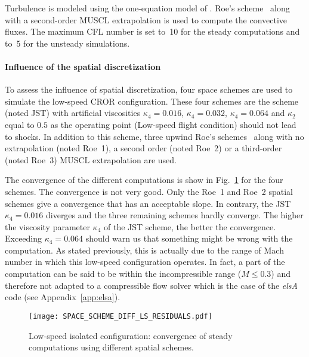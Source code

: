 Turbulence is modeled using the one-equation model of
\citet{Spalart1992}.  Roe's scheme~\cite{Roe1981} along with a 
second-order MUSCL extrapolation 
is used to compute the convective fluxes.
The maximum CFL number is set to~10 for the steady 
computations and to~5 for the unsteady simulations.

\paragraph{Influence of the spatial discretization} %
\label{sub:dream_ls_spatial_discretization}

To assess the influence of spatial discretization, four 
space schemes are used to simulate the low-speed CROR configuration.
These four schemes are the \citet{Jameson1981} scheme (noted JST) with artificial
viscosities $\kappa_4 = 0.016$, $\kappa_4 = 0.032$, $\kappa_4 = 0.064$
and $\kappa_2$ equal to $0.5$ as the operating point (Low-speed
flight condition) should not 
lead to shocks. In addition to this scheme, three upwind
Roe's schemes~\cite{Roe1981} along with no extrapolation (noted Roe~1),
a second order (noted Roe~2) or a third-order (noted Roe~3) 
MUSCL extrapolation are used.

The convergence of the different computations is show 
in Fig.~\ref{fig:dream_ls_space_scheme_residual}
for the four schemes. The convergence is not 
very good. Only the Roe~1 and Roe~2 spatial schemes give 
a convergence that has an acceptable slope. In contrary,
the JST~$\kappa_4 = 0.016$ diverges and the three
remaining schemes hardly converge. The higher the
viscosity parameter $\kappa_4$ of the JST scheme, the better
the convergence. Exceeding $\kappa_4 = 0.064$ should
warn us that something might be wrong with the computation.
As stated previously, this is actually due to the range of Mach
number in which this low-speed configuration operates. In fact,
a part of the computation can be said to be within the incompressible
range ($M \leq 0.3$) and therefore not adapted to a compressible
flow solver which is the case of the \emph{elsA} code 
(see Appendix~\ref{app:elsa}).
\begin{figure}[htp]
  \centering
  \texttt{[image: SPACE\_SCHEME\_DIFF\_LS\_RESIDUALS.pdf]}
  \caption{Low-speed isolated configuration: convergence of 
  steady computations using different spatial schemes.}
  \label{fig:dream_ls_space_scheme_residual}
\end{figure}

